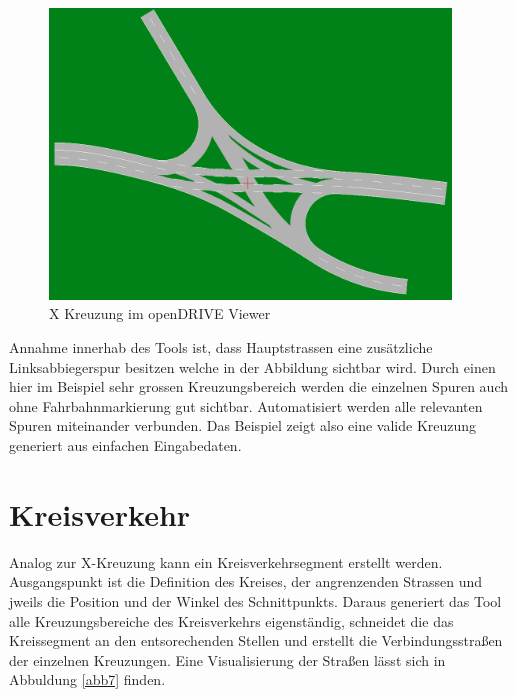 \begin{figure}[H]
	\flushleft
	\includegraphics[width=0.95\textwidth]{fig/fig6.png}
	\caption{X Kreuzung im openDRIVE Viewer}
	\label{abb6}
\end{figure}

Annahme innerhab des Tools ist, dass Hauptstrassen eine zusätzliche Linksabbiegerspur besitzen welche in der Abbildung sichtbar wird. Durch einen hier im Beispiel sehr grossen Kreuzungsbereich werden die einzelnen Spuren auch ohne Fahrbahnmarkierung gut sichtbar. Automatisiert werden alle relevanten Spuren miteinander verbunden. Das Beispiel zeigt also eine valide Kreuzung generiert aus einfachen Eingabedaten.

\section{Kreisverkehr}
Analog zur X-Kreuzung kann ein Kreisverkehrsegment erstellt werden. Ausgangspunkt ist die Definition des Kreises, der angrenzenden Strassen und jweils die Position und der Winkel des Schnittpunkts. Daraus generiert das Tool alle Kreuzungsbereiche des Kreisverkehrs eigenständig, schneidet die das Kreissegment an den entsorechenden Stellen und erstellt die Verbindungsstraßen der einzelnen Kreuzungen. Eine Visualisierung der Straßen lässt sich in Abbuldung \ref{abb7} finden.

